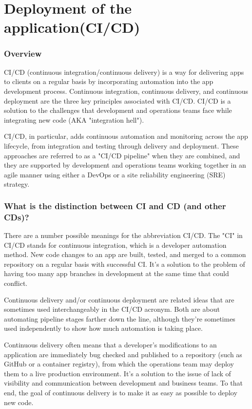 \chapter{Deployment of the application(CI/CD)}\label{sect:cicd}

\subsection*{Overview}
\tab CI/CD \cite{cicd} (continuous integration/continuous delivery) is a way for delivering apps to clients on a regular basis by incorporating automation into the app development process. Continuous integration, continuous delivery, and continuous deployment are the three key principles associated with CI/CD. CI/CD is a solution to the challenges that development and operations teams face while integrating new code (AKA "integration hell").

\tab CI/CD, in particular, adds continuous automation and monitoring across the app lifecycle, from integration and testing through delivery and deployment. These approaches are referred to as a "CI/CD pipeline" when they are combined, and they are supported by development and operations teams working together in an agile manner using either a DevOps or a site reliability engineering (SRE) strategy.

\subsection*{What is the distinction between CI and CD (and other CDs)?}
\tab There are a number possible meanings for the abbreviation CI/CD. The "CI" in CI/CD stands for continuous integration, which is a developer automation method. New code changes to an app are built, tested, and merged to a common repository on a regular basis with successful CI. It's a solution to the problem of having too many app branches in development at the same time that could conflict.

\tab Continuous delivery and/or continuous deployment are related ideas that are sometimes used interchangeably in the CI/CD acronym. Both are about automating pipeline stages farther down the line, although they're sometimes used independently to show how much automation is taking place.

\tab Continuous delivery often means that a developer's modifications to an application are immediately bug checked and published to a repository (such as GitHub or a container registry), from which the operations team may deploy them to a live production environment. It's a solution to the issue of lack of visibility and communication between development and business teams. To that end, the goal of continuous delivery is to make it as easy as possible to deploy new code.

